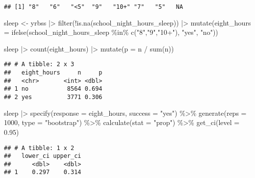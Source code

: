 \documentclass[
]{article}
\newenvironment{Shaded}{\begin{snugshade}}{\end{snugshade}}
\newcommand{\AttributeTok}[1]{\textcolor[rgb]{0.77,0.63,0.00}{#1}}
\newcommand{\DecValTok}[1]{\textcolor[rgb]{0.00,0.00,0.81}{#1}}
\newcommand{\FloatTok}[1]{\textcolor[rgb]{0.00,0.00,0.81}{#1}}
\newcommand{\FunctionTok}[1]{\textcolor[rgb]{0.00,0.00,0.00}{#1}}
\newcommand{\NormalTok}[1]{#1}
\newcommand{\OtherTok}[1]{\textcolor[rgb]{0.56,0.35,0.01}{#1}}
\newcommand{\SpecialCharTok}[1]{\textcolor[rgb]{0.00,0.00,0.00}{#1}}
\newcommand{\StringTok}[1]{\textcolor[rgb]{0.31,0.60,0.02}{#1}}
\begin{document}
\begin{verbatim}
## [1] "8"   "6"   "<5"  "9"   "10+" "7"   "5"   NA
\end{verbatim}

\begin{Shaded}
\begin{Highlighting}[]
\NormalTok{sleep }\OtherTok{\textless{}{-}}\NormalTok{ yrbss }\SpecialCharTok{|\textgreater{}}
  \FunctionTok{filter}\NormalTok{(}\SpecialCharTok{!}\FunctionTok{is.na}\NormalTok{(school\_night\_hours\_sleep)) }\SpecialCharTok{|\textgreater{}}
  \FunctionTok{mutate}\NormalTok{(}\AttributeTok{eight\_hours =} \FunctionTok{ifelse}\NormalTok{(school\_night\_hours\_sleep }\SpecialCharTok{\%in\%} \FunctionTok{c}\NormalTok{(}\StringTok{"8"}\NormalTok{,}\StringTok{"9"}\NormalTok{,}\StringTok{"10+"}\NormalTok{), }\StringTok{"yes"}\NormalTok{, }\StringTok{"no"}\NormalTok{))}

\NormalTok{sleep }\SpecialCharTok{|\textgreater{}}
  \FunctionTok{count}\NormalTok{(eight\_hours) }\SpecialCharTok{|\textgreater{}}
  \FunctionTok{mutate}\NormalTok{(}\AttributeTok{p =}\NormalTok{ n }\SpecialCharTok{/} \FunctionTok{sum}\NormalTok{(n))}
\end{Highlighting}
\end{Shaded}

\begin{verbatim}
## # A tibble: 2 x 3
##   eight_hours     n     p
##   <chr>       <int> <dbl>
## 1 no           8564 0.694
## 2 yes          3771 0.306
\end{verbatim}

\begin{Shaded}
\begin{Highlighting}[]
\NormalTok{sleep }\SpecialCharTok{|\textgreater{}}
  \FunctionTok{specify}\NormalTok{(}\AttributeTok{response =}\NormalTok{ eight\_hours, }\AttributeTok{success =} \StringTok{"yes"}\NormalTok{) }\SpecialCharTok{\%\textgreater{}\%}
  \FunctionTok{generate}\NormalTok{(}\AttributeTok{reps =} \DecValTok{1000}\NormalTok{, }\AttributeTok{type =} \StringTok{"bootstrap"}\NormalTok{) }\SpecialCharTok{\%\textgreater{}\%}
  \FunctionTok{calculate}\NormalTok{(}\AttributeTok{stat =} \StringTok{"prop"}\NormalTok{) }\SpecialCharTok{\%\textgreater{}\%}
  \FunctionTok{get\_ci}\NormalTok{(}\AttributeTok{level =} \FloatTok{0.95}\NormalTok{)}
\end{Highlighting}
\end{Shaded}

\begin{verbatim}
## # A tibble: 1 x 2
##   lower_ci upper_ci
##      <dbl>    <dbl>
## 1    0.297    0.314
\end{verbatim}
\end{document}
